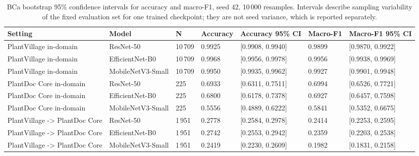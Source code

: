 \begin{table}[htbp]
\caption{BCa bootstrap 95\% confidence intervals for accuracy and macro-F1, seed 42, 10\,000 resamples. Intervals describe sampling variability of the fixed evaluation set for one trained checkpoint; they are not seed variance, which is reported separately.}
\label{tab:confidence-intervals}
\small
\centering
\setlength{\tabcolsep}{4pt}
\begin{tabular}{lllllll}
\toprule
Setting & Model & N & Accuracy & Accuracy 95\% CI & Macro-F1 & Macro-F1 95\% CI \\
\midrule
PlantVillage in-domain & ResNet-50 & 10\,709 & 0.9925 & [0.9908, 0.9940] & 0.9899 & [0.9870, 0.9922] \\
PlantVillage in-domain & EfficientNet-B0 & 10\,709 & 0.9968 & [0.9956, 0.9978] & 0.9956 & [0.9938, 0.9969] \\
PlantVillage in-domain & MobileNetV3-Small & 10\,709 & 0.9950 & [0.9935, 0.9962] & 0.9927 & [0.9901, 0.9948] \\
PlantDoc Core in-domain & ResNet-50 & 225 & 0.6933 & [0.6311, 0.7511] & 0.6994 & [0.6526, 0.7721] \\
PlantDoc Core in-domain & EfficientNet-B0 & 225 & 0.6800 & [0.6178, 0.7378] & 0.6927 & [0.6457, 0.7598] \\
PlantDoc Core in-domain & MobileNetV3-Small & 225 & 0.5556 & [0.4889, 0.6222] & 0.5841 & [0.5352, 0.6675] \\
PlantVillage -> PlantDoc Core & ResNet-50 & 1\,951 & 0.2778 & [0.2584, 0.2978] & 0.2414 & [0.2253, 0.2595] \\
PlantVillage -> PlantDoc Core & EfficientNet-B0 & 1\,951 & 0.2742 & [0.2553, 0.2942] & 0.2359 & [0.2203, 0.2538] \\
PlantVillage -> PlantDoc Core & MobileNetV3-Small & 1\,951 & 0.2419 & [0.2230, 0.2609] & 0.1982 & [0.1831, 0.2158] \\
\bottomrule
\end{tabular}
\end{table}
